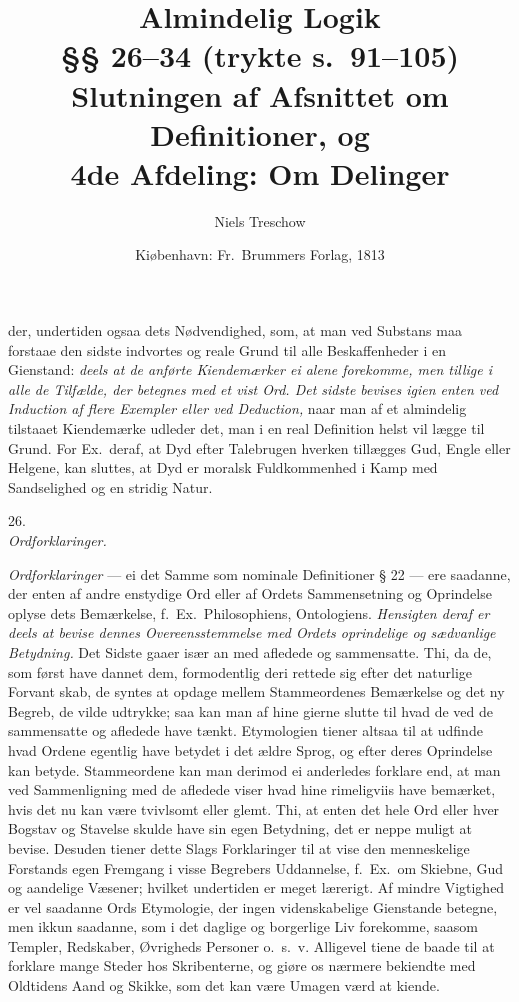 \documentclass[12pt,a4paper]{article}
\title{\textbf{Almindelig Logik}\\[6pt]
  \large §§ 26--34 (trykte s.\ 91--105)\\[4pt]
  \normalsize Slutningen af Afsnittet om Definitioner, og\\
  \large 4de Afdeling: Om Delinger}
\author{Niels Treschow}
\date{\small Kiøbenhavn: Fr.\ Brummers Forlag, 1813}
\newcommand{\logsec}[2]{%
  \bigskip\begin{center}{\large #1}\\[4pt]{\emph{#2}}\end{center}\smallskip}
\newcommand{\opage}[1]{\marginnote{\footnotesize\textit{[#1]}}}
\begin{document}
\maketitle
\thispagestyle{fancy}

\bigskip


\opage{91} \noindent
[\dots] der, undertiden ogsaa dets Nødvendighed, som, at man ved Substans maa
forstaae den sidste indvortes og reale Grund til alle Beskaffenheder i en
Gienstand: \emph{deels at de anførte Kiendemærker ei alene forekomme, men
tillige i alle de Tilfælde, der betegnes med et vist Ord. Det sidste bevises
igien enten ved Induction af flere Exempler eller ved Deduction,} naar man af
et almindelig tilstaaet Kiendemærke udleder det, man i en real Definition helst
vil lægge til Grund. For Ex.\ deraf, at Dyd efter Talebrugen hverken tillægges
Gud, Engle eller Helgene, kan sluttes, at Dyd er moralsk Fuldkommenhed i Kamp
med Sandselighed og en stridig Natur.

\logsec{26.}{Ordforklaringer.}

\noindent
\emph{Ordforklaringer} --- ei det Samme som nominale Definitioner § 22 --- ere
saadanne, der enten af andre enstydige Ord eller af Ordets Sammensetning og
Oprindelse oplyse dets Bemærkelse, f.~Ex.\ Philosophiens, Ontologiens.
\emph{Hensigten deraf er deels at bevise dennes Overeensstemmelse med Ordets
oprindelige og sædvanlige Betydning.}
Det Sidste gaaer især an med afledede og sammensatte. Thi, da de, som først
have dannet dem, formodentlig deri rettede sig efter det naturlige Forvant%
\opage{92}skab, de syntes at opdage mellem Stammeordenes Bemærkelse og det ny Begreb, de
vilde udtrykke; saa kan man af hine gierne slutte til hvad de ved de
sammensatte og afledede have tænkt. Etymologien tiener altsaa til at udfinde
hvad Ordene egentlig have betydet i det ældre Sprog, og efter deres Oprindelse
kan betyde. Stammeordene kan man derimod ei anderledes forklare end, at man ved
Sammenligning med de afledede viser hvad hine rimeligviis have bemærket, hvis
det nu kan være tvivlsomt eller glemt. Thi, at enten det hele Ord eller hver
Bogstav og Stavelse skulde have sin egen Betydning, det er neppe muligt at
bevise. Desuden tiener dette Slags Forklaringer til at vise den menneskelige
Forstands egen Fremgang i visse Begrebers Uddannelse, f.~Ex.\ om Skiebne, Gud og
aandelige Væsener; hvilket undertiden er meget lærerigt. Af mindre Vigtighed er
vel saadanne Ords Etymologie, der ingen videnskabelige Gienstande betegne, men
ikkun saadanne, som i det daglige og borgerlige Liv forekomme, saasom Templer,
Redskaber, Øvrigheds Personer o.~s.~v. Alligevel tiene de baade til at forklare
mange Steder hos Skribenterne, og giøre os nærmere bekiendte med Oldtidens Aand
og Skikke, som det kan være Umagen værd at kiende.
\end{document}
